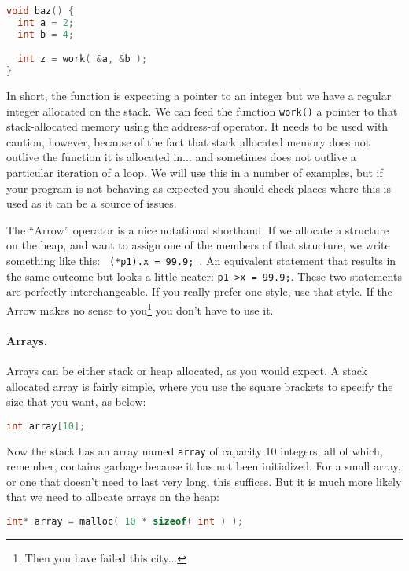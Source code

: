 \begin{lstlisting}[language=C]
void baz() {
  int a = 2;
  int b = 4;

  int z = work( &a, &b );
}
\end{lstlisting}

In short, the function is expecting a pointer to an integer but we have a regular integer allocated on the stack. We can feed the function \texttt{work()} a pointer to that stack-allocated memory using the address-of operator. It needs to be used with caution, however, because of the fact that stack allocated memory does not outlive the function it is allocated in... and sometimes does not outlive a particular iteration of a loop. We will use this in a number of examples, but if your program is not behaving as expected you should check places where this is used as it can be a source of issues.

The ``Arrow'' operator is a nice notational shorthand. If we allocate a structure on the heap, and want to assign one of the members of that structure, we write something like this: \texttt{ (*p1).x = 99.9; }. An equivalent statement that results in the same outcome but looks a little neater: \texttt{p1->x = 99.9;}. These two statements are perfectly interchangeable. If you really prefer one style, use that style. If the Arrow makes no sense to you\footnote{Then you have failed this city...} you don't have to use it.

\paragraph{Arrays.}

Arrays can be either stack or heap allocated, as you would expect. A stack allocated array is fairly simple, where you use the square brackets to specify the size that you want, as below:

\begin{lstlisting}[language=C]
int array[10];
\end{lstlisting}

Now the stack has an array named \texttt{array} of capacity 10 integers, all of which, remember, contains garbage because it has not been initialized. For a small array, or one that doesn't need to last very long, this suffices. But it is much more likely that we need to allocate arrays on the heap:

\begin{lstlisting}[language=C]
int* array = malloc( 10 * sizeof( int ) );
\end{lstlisting}

